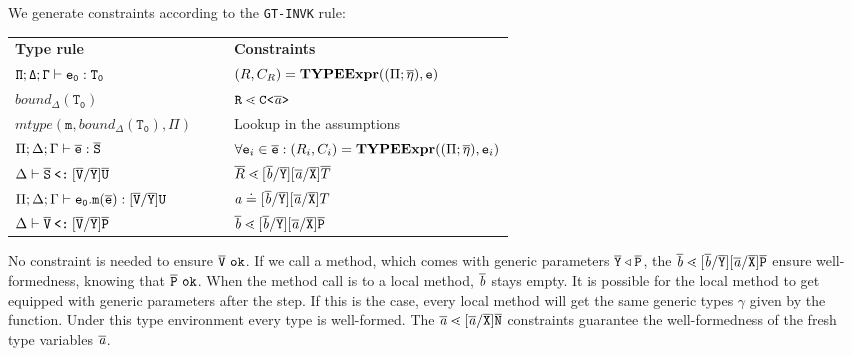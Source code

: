 \begin{description}
We generate constraints according to the \texttt{GT-INVK} rule:\\
\begin{small}
\begin{tabularx}{\linewidth}{lX|Xl}
  \textbf{\TFGJ{} Type rule} &&& \textbf{Constraints} \\
  $\mathtt{\Pi;\Delta;\Gamma \vdash e_0 : T_0 }$ &&&
    $({R}, C_R) = \textbf{TYPEExpr}(({\Pi} ;\overline{\mathtt{\eta}}), \texttt{e})$\\ 
  $\mathtt{\mathit{bound}_\Delta (T_0)}$ &&& $\texttt{R} \lessdot \mathtt{C \texttt{<} \overline{\tt \mathit{ a }} \texttt{>} }$ \\
  $\mathtt{\mathit{mtype}(m, \mathit{bound}_\Delta (T_0), \Pi)}$ &&& Lookup in the assumptions \\
 $\Pi;\Delta;\Gamma \vdash \overline{\tt e} : \overline{\tt S}$ &&& $\forall \texttt{e}_i \in \overline{\tt e} : (R_i, C_i) = \textbf{TYPEExpr}(({\Pi} ;
 \overline{\mathtt{\eta}}), \texttt{e}_i)$\\
 $\Delta \vdash \overline{\tt S} \mathbin{\texttt{<:}}  [\overline{\tt V}/\overline{\tt Y}]\overline{\tt U}$ &&& $ \overline{R} \lessdot [\overline{\tt \mathit{ b }}/\overline{\tt Y}][\overline{\tt \mathit{ a }}/\overline{\tt X}]\overline{T}$\\
 $\Pi;\Delta;\Gamma \vdash \mathtt{e_0.m(\overline{e}) : [\overline{\tt V}/\overline{\tt Y}]U }$ &&& $ \mathit{ a } \doteq [\overline{\tt \mathit{ b }}/\overline{\tt Y}][\overline{\tt \mathit{ a }}/\overline{\tt X}]{T}$ \\
 $\Delta \vdash \overline{\tt V} \mathbin{\texttt{<:}}  [\overline{\tt V}/\overline{\tt Y}]\overline{\tt P}$ &&& $\overline{\tt \mathit{ b }} \lessdot [\overline{\tt \mathit{ b }}/\overline{\tt Y}][\overline{\tt \mathit{ a }}/\overline{\tt X}]\overline{\tt P}$ \\
\end{tabularx}
\end{small}

No constraint is needed to ensure $\ol{V}\ \texttt{ok}$.
If we call a method, which comes with generic parameters $\overline{\tt Y} \triangleleft \overline{\tt P}$,
the $\overline{\tt \mathit{ b }} \lessdot [\overline{\tt \mathit{ b }}/\overline{\tt Y}][\overline{\tt \mathit{ a }}/\overline{\tt X}]\overline{\tt P}$ ensure well-formedness, knowing that $\ol{P}\ \texttt{ok}$.
When the method call is to a local method, $\overline{\tt \mathit{ b }}$ stays empty.
It is possible for the local method to get equipped with generic parameters after the \unify{} step.
If this is the case, every local method will get the same generic types $\gamma$ given by the \unify{} function.
Under this type environment every type is well-formed.
The $\overline{\tt \mathit{ a }} \lessdot [\overline{\mathit{ a }}/\overline{\tt X}]\overline{\tt N}$ constraints guarantee the well-formedness of the fresh type variables $\overline{\tt \mathit{ a }}$.


\end{description}
